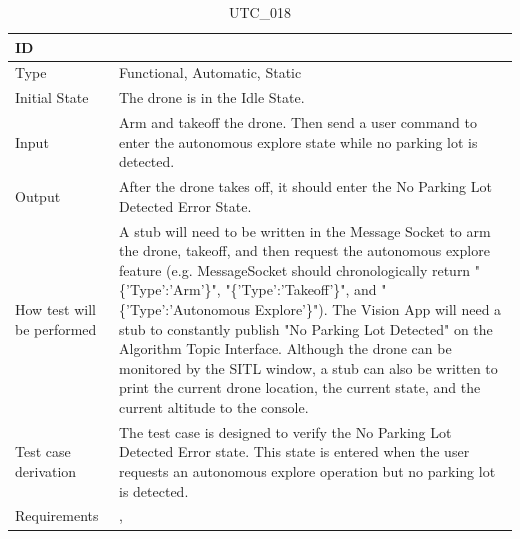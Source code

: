 \documentclass[12pt, titlepage]{article}
\begin{document}
\begin{table}[!h]
\begin{center}
\caption {UTC\_018}
\label{tab:UTC_018}
\begin{tabular}{ | m{3.2cm} | m{12.2cm} | } 
\hline
ID & \nameref{tab:UTC_018} \\ 
\hline
Type &  Functional, Automatic, Static  \\ 
\hline
Initial State & The drone is in the Idle State. \\ 
\hline
Input &  Arm and takeoff the drone. Then send a user command to enter the autonomous explore state while no parking lot is detected. \\ 
\hline
Output &  After the drone takes off, it should enter the No Parking Lot Detected Error State.\\  
\hline
How test will be performed & A stub will need to be written in the Message Socket to arm the drone, takeoff, and then request the autonomous explore feature (e.g. MessageSocket should chronologically return "\{'Type':'Arm'\}", "\{'Type':'Takeoff'\}", and "\{'Type':'Autonomous Explore'\}"). The Vision App will need a stub to constantly publish "No Parking Lot Detected" on the Algorithm Topic Interface. Although the drone can be monitored by the SITL window, a stub can also be written to print the current drone location, the current state, and the current altitude to the console.\\ 
\hline
Test case derivation &  The test case is designed to verify the No Parking Lot Detected Error state. This state is entered when the user requests an autonomous explore operation but no parking lot is detected. \\ 
\hline
Requirements & \nameref{STA_008}, \nameref{TRANS_008} \\ 
\hline
\end{tabular}
\end{center}
\end{table}
\end{document}
